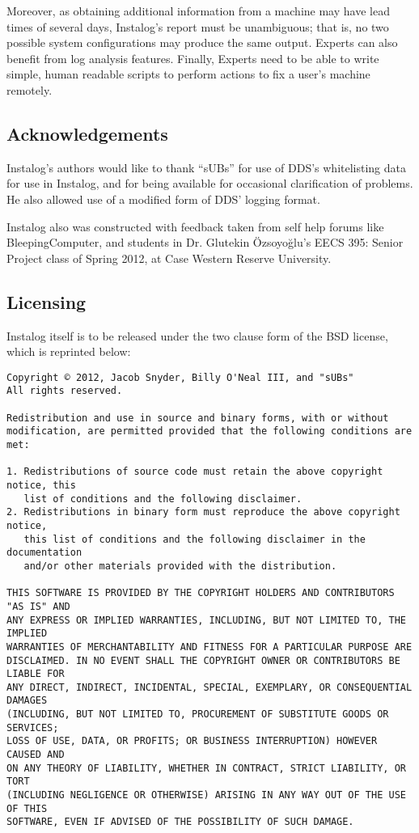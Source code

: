 Moreover, as obtaining additional information from a machine may
have lead times of several days, Instalog's report must be unambiguous; that is,
no two possible system configurations may produce the same output. Experts can
also benefit from log analysis features. Finally, Experts need to be able to
write simple, human readable scripts to perform actions to fix a user's machine
remotely.

\subsection{Acknowledgements}
Instalog's authors would like to thank ``sUBs'' for use of DDS's whitelisting
data for use in Instalog, and for being available for occasional clarification
of problems. He also allowed use of a modified form of DDS' logging format.

Instalog also was constructed with feedback taken from self help forums like
BleepingComputer, and students in Dr. Glutekin Özsoyoğlu's EECS 395: Senior
Project class of Spring 2012, at Case Western Reserve University.

\subsection{Licensing} \label{sec:licensing}
Instalog itself is to be released under the two clause form of the BSD license,
which is reprinted below:

\begin{verbatim}
Copyright © 2012, Jacob Snyder, Billy O'Neal III, and "sUBs"
All rights reserved.

Redistribution and use in source and binary forms, with or without
modification, are permitted provided that the following conditions are met: 

1. Redistributions of source code must retain the above copyright notice, this
   list of conditions and the following disclaimer. 
2. Redistributions in binary form must reproduce the above copyright notice,
   this list of conditions and the following disclaimer in the documentation
   and/or other materials provided with the distribution. 

THIS SOFTWARE IS PROVIDED BY THE COPYRIGHT HOLDERS AND CONTRIBUTORS "AS IS" AND
ANY EXPRESS OR IMPLIED WARRANTIES, INCLUDING, BUT NOT LIMITED TO, THE IMPLIED
WARRANTIES OF MERCHANTABILITY AND FITNESS FOR A PARTICULAR PURPOSE ARE
DISCLAIMED. IN NO EVENT SHALL THE COPYRIGHT OWNER OR CONTRIBUTORS BE LIABLE FOR
ANY DIRECT, INDIRECT, INCIDENTAL, SPECIAL, EXEMPLARY, OR CONSEQUENTIAL DAMAGES
(INCLUDING, BUT NOT LIMITED TO, PROCUREMENT OF SUBSTITUTE GOODS OR SERVICES;
LOSS OF USE, DATA, OR PROFITS; OR BUSINESS INTERRUPTION) HOWEVER CAUSED AND
ON ANY THEORY OF LIABILITY, WHETHER IN CONTRACT, STRICT LIABILITY, OR TORT
(INCLUDING NEGLIGENCE OR OTHERWISE) ARISING IN ANY WAY OUT OF THE USE OF THIS
SOFTWARE, EVEN IF ADVISED OF THE POSSIBILITY OF SUCH DAMAGE.
\end{verbatim}


